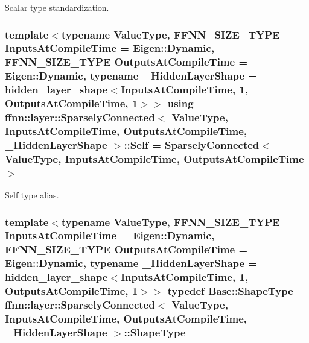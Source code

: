 Scalar type standardization. 

\hypertarget{classffnn_1_1layer_1_1_sparsely_connected_a04d7cf664720eb81c2ac34c9b6025357}{
\subsubsection[{Self}]{\setlength{\rightskip}{0pt plus 5cm}template$<$typename Value\-Type, F\-F\-N\-N\-\_\-\-S\-I\-Z\-E\-\_\-\-T\-Y\-P\-E Inputs\-At\-Compile\-Time = Eigen\-::\-Dynamic, F\-F\-N\-N\-\_\-\-S\-I\-Z\-E\-\_\-\-T\-Y\-P\-E Outputs\-At\-Compile\-Time = Eigen\-::\-Dynamic, typename \-\_\-\-Hidden\-Layer\-Shape = hidden\-\_\-layer\-\_\-shape$<$\-Inputs\-At\-Compile\-Time, 1, Outputs\-At\-Compile\-Time, 1$>$$>$ using {\bf ffnn\-::layer\-::\-Sparsely\-Connected}$<$ Value\-Type, Inputs\-At\-Compile\-Time, Outputs\-At\-Compile\-Time, \-\_\-\-Hidden\-Layer\-Shape $>$\-::{\bf Self} =  {\bf Sparsely\-Connected}$<$Value\-Type, Inputs\-At\-Compile\-Time, Outputs\-At\-Compile\-Time$>$}}\label{classffnn_1_1layer_1_1_sparsely_connected_a04d7cf664720eb81c2ac34c9b6025357}


Self type alias. 

\hypertarget{classffnn_1_1layer_1_1_sparsely_connected_a3402308adea340327d9305dce67fec60}{
\subsubsection[{Shape\-Type}]{\setlength{\rightskip}{0pt plus 5cm}template$<$typename Value\-Type, F\-F\-N\-N\-\_\-\-S\-I\-Z\-E\-\_\-\-T\-Y\-P\-E Inputs\-At\-Compile\-Time = Eigen\-::\-Dynamic, F\-F\-N\-N\-\_\-\-S\-I\-Z\-E\-\_\-\-T\-Y\-P\-E Outputs\-At\-Compile\-Time = Eigen\-::\-Dynamic, typename \-\_\-\-Hidden\-Layer\-Shape = hidden\-\_\-layer\-\_\-shape$<$\-Inputs\-At\-Compile\-Time, 1, Outputs\-At\-Compile\-Time, 1$>$$>$ typedef {\bf Base\-::\-Shape\-Type} {\bf ffnn\-::layer\-::\-Sparsely\-Connected}$<$ Value\-Type, Inputs\-At\-Compile\-Time, Outputs\-At\-Compile\-Time, \-\_\-\-Hidden\-Layer\-Shape $>$\-::{\bf Shape\-Type}}}\label{classffnn_1_1layer_1_1_sparsely_connected_a3402308adea340327d9305dce67fec60}


